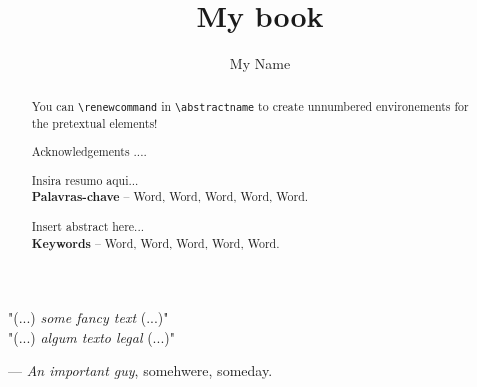 \documentclass[language=english,debug=true,a4paper,twoside,12pt]{lmc}
\author{My Name}
\title{My book}
\date{\the\year}
\begin{document}
%    

\cover 
\TitlePage{}



\renewcommand{\abstractname}{Dedication}
\begin{abstract}
    You can \verb!\renewcommand! in \verb!\abstractname! to create unnumbered environements for the pretextual elements!
\end{abstract}

\renewcommand{\abstractname}{Acknowledgements}
\begin{abstract}
    Acknowledgements ....
\end{abstract}

\cleardoublepage

\vspace*{\fill}
\epigraph{
    "(...) \textit{some fancy text} (...)"
    \vspace{6pt}\\
    "(...) \textit{algum texto legal} (...)" 
    \vspace{6pt}
}{--- \textit{An important guy}, somehwere, someday.}
\vspace*{\fill}

\renewcommand{\abstractname}{Resumo}
\begin{abstract}
    
    Insira resumo aqui...
    \\[3\baselineskip]
    \textbf{Palavras-chave} -- Word, Word, Word, Word, Word.
\end{abstract}


\renewcommand{\abstractname}{Abstract}
\begin{abstract}
    Insert abstract here...
    \\[3\baselineskip]
    \textbf{Keywords} -- Word, Word, Word, Word, Word. 
\end{abstract}
\end{document}

